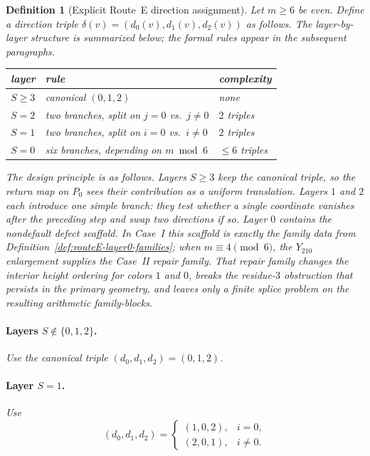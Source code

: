 \documentclass[11pt]{article}
\newtheorem{definition}{Definition}
\begin{document}
\begin{definition}[Explicit Route~E direction assignment]\label{def:routeE}
Let $m\ge 6$ be even. Define a direction triple $\delta(v)=(d_0(v),d_1(v),d_2(v))$ as follows.
The layer-by-layer structure is summarized below; the formal rules appear in the subsequent paragraphs.

\smallskip
\begin{center}
\footnotesize
\begin{tabular}{@{}lll@{}}
\toprule
layer & rule & complexity \\
\midrule
$S\ge 3$ & canonical $(0,1,2)$ & none \\
$S=2$ & two branches, split on $j=0$ vs.\ $j\ne 0$ & $2$ triples \\
$S=1$ & two branches, split on $i=0$ vs.\ $i\ne 0$ & $2$ triples \\
$S=0$ & six branches, depending on $m\bmod 6$ & $\le 6$ triples \\
\bottomrule
\end{tabular}
\end{center}
\smallskip

\noindent
The design principle is as follows.
Layers $S\ge 3$ keep the canonical triple, so the return map on $P_0$ sees their contribution as a uniform translation.
Layers $1$ and $2$ each introduce one simple branch: they test whether a single coordinate vanishes after the preceding step and swap two directions if so.
Layer $0$ contains the nondefault defect scaffold.
In Case~I this scaffold is exactly the family data from Definition~\ref{def:routeE-layer0-families}; when $m\equiv 4\pmod 6$, the $Y_{210}$ enlargement supplies the Case~II repair family.
That repair family changes the interior height ordering for colors $1$ and $0$, breaks the residue-$3$ obstruction that persists in the primary geometry, and leaves only a finite splice problem on the resulting arithmetic family-blocks.

\paragraph{Layers $S\notin\{0,1,2\}$.}
Use the canonical triple $(d_0,d_1,d_2)=(0,1,2)$.

\paragraph{Layer $S=1$.}
Use
\[
(d_0,d_1,d_2)=
\begin{cases}
(1,0,2), & i=0,\\
(2,0,1), & i\ne 0.
\end{cases}
\]


\end{definition}
\end{document}
